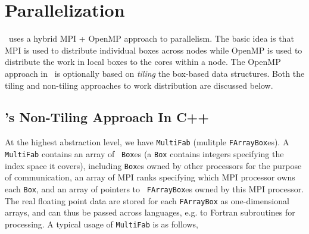 \section{Parallelization}

\amrex\ uses a hybrid MPI + OpenMP approach to parallelism.  The
basic idea is that MPI is used to distribute individual boxes across
nodes while OpenMP is used to distribute the work in local boxes to
the cores within a node.  The OpenMP approach in \amrex\ is optionally
based on {\em tiling} the box-based data structures.  Both the tiling and
non-tiling approaches to work distribution are discussed below.


\subsection{\amrex's Non-Tiling Approach In C++}
\label{sec:amrex0}

At the highest abstraction level, we have {\tt MultiFab} (mulitple
{\tt FArrayBox}es).  A {\tt MultiFab} contains an array of {\tt
  Box}es (a {\tt Box} contains integers specifying the index space it
covers), including {\tt Box}es owned by other processors for the
purpose of communication, an array of MPI ranks specifying which MPI
processor owns each {\tt Box}, and an array of pointers to {\tt
  FArrayBox}es owned by this MPI processor.  The real floating point
data are stored for each {\tt FArrayBox} as one-dimensional arrays,
and can thus be passed across languages, e.g. to Fortran subroutines
for processing. A typical usage of {\tt MultiFab} is as follows,

